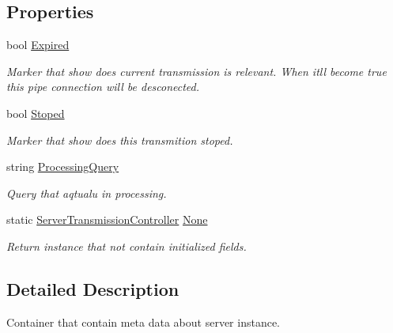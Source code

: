 \subsection*{Properties}
\begin{DoxyCompactItemize}
\item 
bool \mbox{\hyperlink{class_pipes_provider_1_1_server_1_1_server_transmission_controller_adafb92b6d6b1cae42003ba0239ef9acb}{Expired}}
\begin{DoxyCompactList}\small\item\em Marker that show does current transmission is relevant. When it\textquotesingle{}ll become true this pipe connection will be desconected. \end{DoxyCompactList}\item 
bool \mbox{\hyperlink{class_pipes_provider_1_1_server_1_1_server_transmission_controller_a321db56f4e6ca117c077d9622dec8d91}{Stoped}}
\begin{DoxyCompactList}\small\item\em Marker that show does this transmition stoped. \end{DoxyCompactList}\item 
string \mbox{\hyperlink{class_pipes_provider_1_1_server_1_1_server_transmission_controller_aabd5537440acabe98c49c7bbb00408a0}{Processing\+Query}}
\begin{DoxyCompactList}\small\item\em Query that aqtualu in processing. \end{DoxyCompactList}\item 
static \mbox{\hyperlink{class_pipes_provider_1_1_server_1_1_server_transmission_controller}{Server\+Transmission\+Controller}} \mbox{\hyperlink{class_pipes_provider_1_1_server_1_1_server_transmission_controller_ad8b5ce1e6f928400a384354a0c9502a2}{None}}
\begin{DoxyCompactList}\small\item\em Return instance that not contain initialized fields. \end{DoxyCompactList}\end{DoxyCompactItemize}


\subsection{Detailed Description}
Container that contain meta data about server instance. 



